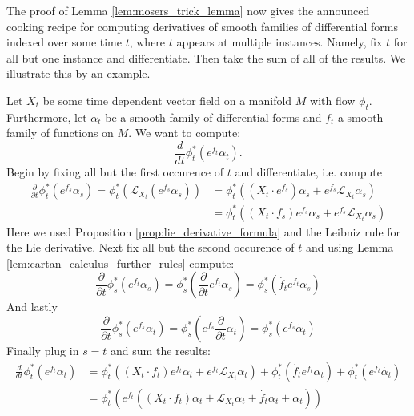
The proof of Lemma \ref{lem:mosers_trick_lemma} now gives the announced cooking recipe for computing derivatives of smooth families of differential forms indexed over some time $t$, where $t$ appears at multiple instances. Namely, fix $t$ for all but one instance and differentiate. Then take the sum of all of the results. We illustrate this by an example.

\begin{example}
    Let $X_t$ be some time dependent vector field on a manifold $M$ with flow $\phi_t$. Furthermore, let $\alpha_t$ be a smooth family of differential forms and $f_t$ a smooth family of functions on $M$. We want to compute:
    \[
    \frac{d}{dt}\phi_t^\ast(e^{f_t}\alpha_t).
    \]
    Begin by fixing all but the first occurence of $t$ and differentiate, i.e. compute
    \begin{align*}
        \frac{\partial}{\partial t} \phi_t^\ast(e^{f_s}\alpha_s) = \phi_t^\ast(\mathcal{L}_{X_t}(e^{f_s}\alpha_s)) &= \phi_t^\ast((X_t \cdot e^{f_s})\alpha_s + e^{f_s}\mathcal{L}_{X_t}\alpha_s)\\ &= \phi_t^\ast((X_t \cdot f_s) e^{f_s} \alpha_s + e^{f_s}\mathcal{L}_{X_t}\alpha_s)
    \end{align*}
    Here we used Proposition \ref{prop:lie_derivative_formula} and the Leibniz rule for the Lie derivative. Next fix all but the second occurence of $t$ and using Lemma \ref{lem:cartan_calculus_further_rules} compute:
    \[
        \frac{\partial}{\partial t} \phi_s^\ast(e^{f_t}\alpha_s) = \phi_s^\ast(\frac{\partial }{\partial t}e^{f_t}\alpha_s) = \phi_s^\ast(\dot{f_t}e^{f_t}\alpha_s)
    \]
    And lastly
    \[
        \frac{\partial }{\partial t} \phi_s^\ast(e^{f_s}\alpha_t) = \phi_s^\ast(e^{f_s}\frac{\partial }{\partial t} \alpha_t) = \phi_s^\ast(e^{f_s}\dot{\alpha_t})
    \]
    Finally plug in $s=t$ and sum the results:
    \begin{align*}
        \frac{d}{dt}\phi_t^\ast(e^{f_t}\alpha_t) &= \phi_t^\ast((X_t \cdot f_t) e^{f_t} \alpha_t + e^{f_t}\mathcal{L}_{X_t}\alpha_t) + \phi_t^\ast(\dot{f_t}e^{f_t}\alpha_t) + \phi_t^\ast(e^{f_t}\dot{\alpha_t})\\
        &= \phi_t^\ast(e^{f_t}((X_t \cdot f_t) \alpha_t + \mathcal{L}_{X_t}\alpha_t + \dot{f_t}\alpha_t + \dot{\alpha_t}))
    \end{align*}
\end{example}